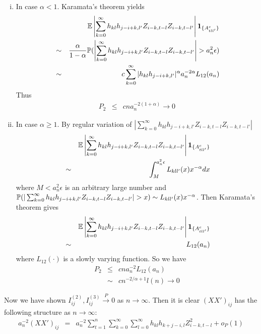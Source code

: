 \documentclass{article}
\begin{document}
\begin{enumerate}[i)]
\item In case $\alpha < 1$. Karamata's theorem yields
  \begin{eqnarray*}
    && \mathbb{E} \left|\sum_{k=0}^\infty h_{kl}h_{j-i+k,l'} Z_{i-k,t-l}Z_{i-k,t-l'}\right| \mathbf{1}_{\{A^c_{tll'}\}} \\
    &\sim& {\alpha \over 1 -\alpha} \mathbb{P}(\left|\sum_{k=0}^\infty h_{kl}h_{j-i+k,l'} Z_{i-k,t-l}Z_{i-k,t-l'}\right| > a_n^2
    \epsilon) \\
    &\sim& c \sum_{k=0}^\infty |h_{kl}h_{j-i+k,l'}|^{\alpha} a_n^{-2\alpha} L_{12}(a_n) \\
  \end{eqnarray*}
  Thus
  \begin{eqnarray*}
    P_2 &\leq& c n a_n^{-2(1 + \alpha)} \to 0
  \end{eqnarray*}
\item In case $\alpha \geq 1$. By regular variation of $|\sum_{k=0}^\infty h_{kl}h_{j-i+k,l'}
  Z_{i-k,t-l}Z_{i-k,t-l'}|$
  \begin{eqnarray*}
    && \mathbb{E}\left| \sum_{k=0}^\infty h_{kl}h_{j-i+k,l'} Z_{i-k,t-l}Z_{i-k,t-l'} \right| \mathbf{1}_{\{A^c_{tll'}\}} \\
    &\sim& \int_{M}^{a_n^2 \epsilon} L_{kll'}(x) x^{-\alpha} dx \\
  \end{eqnarray*}
  where $M < a_n^2 \epsilon$ is an arbitrary large number and $\mathbb{P}(|\sum_{k=0}^\infty
  h_{kl}h_{j-i+k,l'} Z_{i-k,t-l}Z_{i-k,t-l'}| > x) \sim L_{kll'}(x)
  x^{-\alpha}$. Then Karamata's theorem gives
  \begin{eqnarray*}
    && \mathbb{E}\left| \sum_{k=0}^\infty h_{kl}h_{j-i+k,l'} Z_{i-k,t-l}Z_{i-k,t-l'} \right| \mathbf{1}_{\{A^c_{tll'}\}} \\
    &\sim& L_{12}(a_n)
  \end{eqnarray*}
  where $L_{12}(\cdot)$ is a slowly varying function. So we have
  \begin{eqnarray*}
    P_2 &\leq& c n a_n^{-2} L_{12}(a_n)\\
    &\sim& c n^{-2/\alpha + 1} l(n) \to 0
  \end{eqnarray*}
\end{enumerate}
Now we have shown $I^{(2)}_{ij}, I^{(3)}_{ij} \xrightarrow{P} 0$ as $n
\to \infty$. Then it is clear $(XX')_{ij}$ has the following structure
as $n \to \infty$:
\begin{eqnarray*}
  a_n^{-2}(XX')_{ij} &=& a_n^{-2} \sum_{t=1}^n \sum_{k=0}^\infty \sum_{l=0}^\infty
  h_{kl} h_{k+j-i,l} Z_{i-k, t-l}^2 + o_P(1)
\end{eqnarray*}
\end{document}
